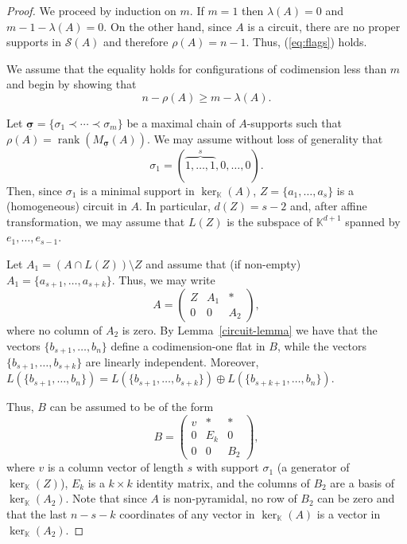 \documentclass[11pt]{amsart}
\theoremstyle{plain}
\theoremstyle{definition}
\theoremstyle{remark}
\newcommand{\rank}{\operatorname{rank}}
\renewcommand{\k}{{\mathbb K}}
\newcommand{\csig}{\ensuremath{\underline{\mathbf \sigma}}}
\numberwithin{equation}{section}
\begin{document}
\begin{proof}
We proceed by induction on $m$. If $m=1$ 
then $\lambda(A) = 0$ and $m - 1 - \lambda(A) =0$.  On the other hand, since $A$ is a circuit, there are no proper supports 
in ${\mathcal S}(A)$ and therefore $\rho(A) = n-1$.  Thus, (\ref{eq:flags}) holds.

We assume that the equality holds for configurations of codimension less than $m$ and begin by showing that 
\begin{equation}\label{first_ineq} 
n-\rho(A) \geq m - \lambda(A).
\end{equation}

  Let $\csig = \{\sigma_1 \prec \cdots \prec \sigma_{m}\}$
be a maximal  chain of $A$-supports such that $\rho(A) = \rank(M_{\csig}(A))$.  
We may assume without loss of generality that 
$$\sigma_1 = (\overbrace{1,\dots,1}^{s},0,\dots,0).$$
Then, since $\sigma_1$ is a minimal support in $\ker_\k(A)$,  $Z=\{a_1,\dots,a_s\}$ is a (homogeneous) circuit  in $A$.
In particular, $d(Z) = s -2 $ and, after affine transformation, we may assume that $  L(Z) $ 
is the subspace of $\k^{d+1}$ spanned by $e_1,\dots,e_{s-1}$.  

Let $A_1= (A \cap L (Z))  \setminus Z$ and assume that (if non-empty) $A_1= \{a_{s+1},\dots,a_{s+k}\}$.
Thus, we may write 
$$A = \left(\begin{array}{ccc}Z & A_1 & \ast \\0 & 0& A_{2}\end{array}\right),$$
where no column of $A_2$ is zero.
By Lemma~\ref{circuit-lemma} we have that the vectors
 $\{b_{s+1},\dots, b_n\}$ define a codimension-one flat in $B$, while the vectors $\{b_{s+1},\dots,b_{s+k}\}$ are linearly independent. Moreover,
$ L(\{b_{s+1},\dots,b_n\}) = L(\{b_{s+1},\dots,b_{s+k}\}) \oplus L(\{b_{s+k+1},\dots,b_n\})
$.

 Thus,  $B$ can be assumed to be of the form
$$B = \left(\begin{array}{ccc}v & \ast & \ast \\0 & E_k & 0 \\0 & 0 & B_2 \end{array}\right),$$
where $v$ is a column vector of length $s$ with support $\sigma_1$ (a generator of $\ker_\k(Z)$), 
$E_k$ is a $k\times k$ identity matrix, and the columns of $B_2$ are a basis of $\ker_\k(A_2)$.  Note that
since $A$ is non-pyramidal, no row of $B_2$ can be zero and that  the last $n-s-k$ coordinates
of any vector in $\ker_\k(A)$ is a vector in $\ker_\k(A_2)$. 


\end{proof}
\end{document}
